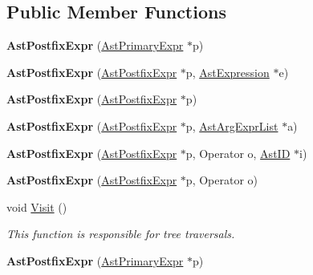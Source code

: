 \subsection*{Public Member Functions}
\begin{DoxyCompactItemize}
\item 
\hypertarget{classAstPostfixExpr_a8299517f87239b0428545cdfc96f0bbc}{{\bfseries Ast\-Postfix\-Expr} (\hyperlink{classAstPrimaryExpr}{Ast\-Primary\-Expr} $\ast$p)}\label{classAstPostfixExpr_a8299517f87239b0428545cdfc96f0bbc}

\item 
\hypertarget{classAstPostfixExpr_a5dd762cbae8160f94a661ecdf3a90770}{{\bfseries Ast\-Postfix\-Expr} (\hyperlink{classAstPostfixExpr}{Ast\-Postfix\-Expr} $\ast$p, \hyperlink{classAstExpression}{Ast\-Expression} $\ast$e)}\label{classAstPostfixExpr_a5dd762cbae8160f94a661ecdf3a90770}

\item 
\hypertarget{classAstPostfixExpr_af17b325f38a7138728773d86a9342105}{{\bfseries Ast\-Postfix\-Expr} (\hyperlink{classAstPostfixExpr}{Ast\-Postfix\-Expr} $\ast$p)}\label{classAstPostfixExpr_af17b325f38a7138728773d86a9342105}

\item 
\hypertarget{classAstPostfixExpr_a4a1ae7a03b7b29e6641f47479e58aa3b}{{\bfseries Ast\-Postfix\-Expr} (\hyperlink{classAstPostfixExpr}{Ast\-Postfix\-Expr} $\ast$p, \hyperlink{classAstArgExprList}{Ast\-Arg\-Expr\-List} $\ast$a)}\label{classAstPostfixExpr_a4a1ae7a03b7b29e6641f47479e58aa3b}

\item 
\hypertarget{classAstPostfixExpr_a094735e6e2f593a42cc2b9aabc44213b}{{\bfseries Ast\-Postfix\-Expr} (\hyperlink{classAstPostfixExpr}{Ast\-Postfix\-Expr} $\ast$p, Operator o, \hyperlink{classAstID}{Ast\-I\-D} $\ast$i)}\label{classAstPostfixExpr_a094735e6e2f593a42cc2b9aabc44213b}

\item 
\hypertarget{classAstPostfixExpr_a71f3baa5264259031d95741e65de1e07}{{\bfseries Ast\-Postfix\-Expr} (\hyperlink{classAstPostfixExpr}{Ast\-Postfix\-Expr} $\ast$p, Operator o)}\label{classAstPostfixExpr_a71f3baa5264259031d95741e65de1e07}

\item 
void \hyperlink{classAstPostfixExpr_ae3e7fdbd4c2bf888ee62760e6f422cad}{Visit} ()
\begin{DoxyCompactList}\small\item\em This function is responsible for tree traversals. \end{DoxyCompactList}\item 
\hypertarget{classAstPostfixExpr_a8299517f87239b0428545cdfc96f0bbc}{{\bfseries Ast\-Postfix\-Expr} (\hyperlink{classAstPrimaryExpr}{Ast\-Primary\-Expr} $\ast$p)}\label{classAstPostfixExpr_a8299517f87239b0428545cdfc96f0bbc}


\end{DoxyCompactItemize}
